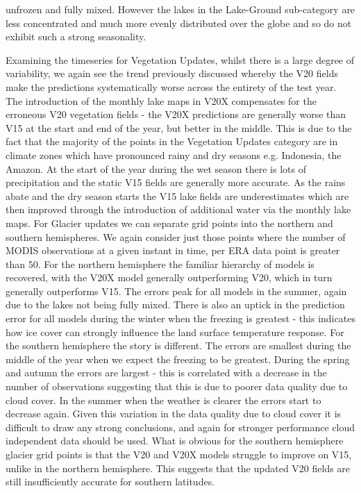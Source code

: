 \documentclass[hess, twostagejnl]{copernicus}
\begin{document}
unfrozen and fully mixed. However the lakes in the Lake-Ground sub-category are less concentrated and much more evenly distributed over the globe and so do not exhibit such a strong seasonality. \newline 

\noindent Examining the timeseries for Vegetation Updates, whilst there is a large degree of variability, we again see the trend previously discussed whereby the V20 fields make the predictions systematically worse across the entirety of the test year. The introduction of the monthly lake maps in V20X compensates for the erroneous V20 vegetation fields - the V20X predictions are generally worse than V15 at the start and end of the year, but better in the middle. This is due to the fact that the majority of the points in the Vegetation Updates category are in climate zones which have pronounced rainy and dry seasons e.g. Indonesia, the Amazon. At the start of the year during the wet season there is lots of precipitation and the static V15 fields are generally more accurate. As the rains abate and the dry season starts the V15 lake fields are underestimates which are then improved through the introduction of additional water via the monthly lake maps.
For Glacier updates we can separate grid points into the northern and southern hemispheres. We again consider just those points where the number of MODIS observations at a given instant in time, per ERA data point is greater than 50. For the northern hemisphere the familiar hierarchy of models is recovered, with the V20X model generally outperforming V20, which in turn generally outperforms V15. The errors peak for all models in the summer, again due to the lakes not being fully mixed. There is also an uptick in the prediction error for all models during the winter when the freezing is greatest - this indicates how ice cover can strongly influence the land surface temperature response. For the southern hemisphere the story is different. The errors are smallest during the middle of the year when we expect the freezing to be greatest. During the spring and autumn the errors are largest - this is correlated with a decrease in the number of observations suggesting that this is due to poorer data quality due to cloud cover. In the summer when the weather is clearer the errors start to decrease again. Given this variation in the data quality due to cloud cover it is difficult to draw any strong conclusions, and again for stronger performance cloud independent data should be used. What is obvious for the southern hemisphere glacier grid points is that the V20 and V20X models struggle to improve on V15, unlike in the northern hemisphere. This suggests that the updated V20 fields are still insufficiently accurate for southern latitudes.
\end{document}
